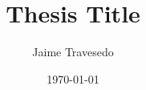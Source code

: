 \documentclass[a4paper,oneside]{tufte-book}
\begin{document}
\title{Thesis Title}
\author{Jaime Travesedo}
\date{\today}
\maketitle

\tableofcontents
\listoffigures
\listoftables










\end{document}
